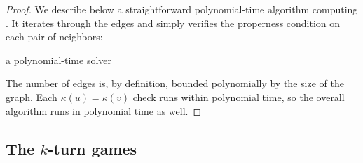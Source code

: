 \begin{proof}

  We describe below a straightforward polynomial-time algorithm computing
  \ColProp.  It iterates through the edges and simply verifies the properness
  condition on each pair of neighbors:

  \begin{algorithm}{a polynomial-time \ColProp{} solver}{}
    \begin{algorithmic}
      \EndIf%
      \EndFor%
    \end{algorithmic}
  \end{algorithm}

  The number of edges is, by definition, bounded polynomially by the size of
  the graph.  Each \(κ(u)=κ(v)\) check runs within polynomial time, so the
  overall algorithm runs in polynomial time as well.  \qedhere

\end{proof}

\subsection{The \(k\)-turn games}


